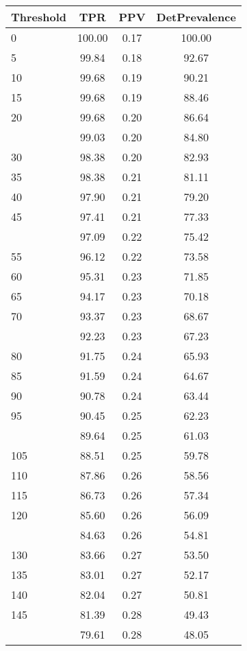 \begin{table}[ht]
\centering
\begin{tabular}{lccc}
  \toprule
Threshold & TPR & PPV & DetPrevalence \\ 
  \midrule
0 & 100.00 & 0.17 & 100.00 \\ 
  5 & 99.84 & 0.18 & 92.67 \\ 
  10 & 99.68 & 0.19 & 90.21 \\ 
  15 & 99.68 & 0.19 & 88.46 \\ 
  20 & 99.68 & 0.20 & 86.64 \\ 
   \addlinespace
25 & 99.03 & 0.20 & 84.80 \\ 
  30 & 98.38 & 0.20 & 82.93 \\ 
  35 & 98.38 & 0.21 & 81.11 \\ 
  40 & 97.90 & 0.21 & 79.20 \\ 
  45 & 97.41 & 0.21 & 77.33 \\ 
   \addlinespace
50 & 97.09 & 0.22 & 75.42 \\ 
  55 & 96.12 & 0.22 & 73.58 \\ 
  60 & 95.31 & 0.23 & 71.85 \\ 
  65 & 94.17 & 0.23 & 70.18 \\ 
  70 & 93.37 & 0.23 & 68.67 \\ 
   \addlinespace
75 & 92.23 & 0.23 & 67.23 \\ 
  80 & 91.75 & 0.24 & 65.93 \\ 
  85 & 91.59 & 0.24 & 64.67 \\ 
  90 & 90.78 & 0.24 & 63.44 \\ 
  95 & 90.45 & 0.25 & 62.23 \\ 
   \addlinespace
100 & 89.64 & 0.25 & 61.03 \\ 
  105 & 88.51 & 0.25 & 59.78 \\ 
  110 & 87.86 & 0.26 & 58.56 \\ 
  115 & 86.73 & 0.26 & 57.34 \\ 
  120 & 85.60 & 0.26 & 56.09 \\ 
   \addlinespace
125 & 84.63 & 0.26 & 54.81 \\ 
  130 & 83.66 & 0.27 & 53.50 \\ 
  135 & 83.01 & 0.27 & 52.17 \\ 
  140 & 82.04 & 0.27 & 50.81 \\ 
  145 & 81.39 & 0.28 & 49.43 \\ 
   \addlinespace
150 & 79.61 & 0.28 & 48.05 \\ 

\end{tabular}
\end{table}
